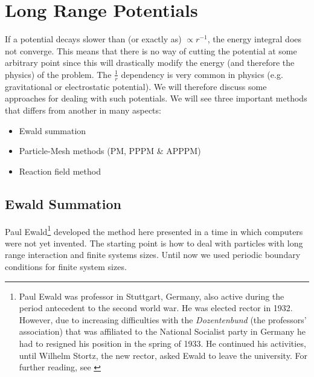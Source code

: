

\section{Long Range Potentials}

If a potential decays slower than (or exactly as) $\propto r^{-1}$, the energy integral does not converge. This means that there is no way of cutting the potential at some arbitrary point since this will drastically modify the energy (and therefore the physics) of the problem. The $\frac{1}{r}$ dependency is very common in  physics (e.g. gravitational or electrostatic potential). We will therefore discuss some approaches for dealing with such potentials. We will see three important methods that differs from another in many aspects:

\begin{itemize}
\item Ewald summation
\item Particle-Mesh methods (PM, PPPM \& APPPM)
\item Reaction field method
\end{itemize}

\subsection{Ewald Summation}

Paul Ewald\footnote{Paul Ewald was professor in Stuttgart, Germany, also active during the period antecedent to the second world war. He was elected rector in 1932. However, due to increasing difficulties with the \emph{Dozentenbund} (the professors' association) that was affiliated to the National Socialist party in Germany he had to resigned his position in the spring of 1933. He continued his activities, until Wilhelm Stortz, the new rector, asked Ewald to leave the university. For further reading, see \citet{ewald_interview}} developed the method here presented in a time in which computers were not yet invented. The starting point is how to deal with particles with long range interaction and finite systems sizes. Until now we used periodic boundary conditions for finite system sizes. 

